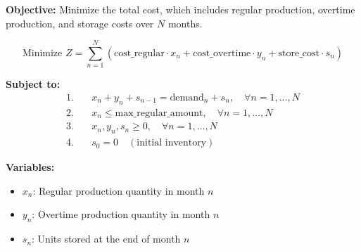 \documentclass{article}
\begin{document}
\textbf{Objective:}
Minimize the total cost, which includes regular production, overtime production, and storage costs over \( N \) months.

\[
\text{Minimize } Z = \sum_{n=1}^{N} ( \text{cost\_regular} \cdot x_n + \text{cost\_overtime} \cdot y_n + \text{store\_cost} \cdot s_n)
\]

\textbf{Subject to:}
\begin{align*}
1. & \quad x_n + y_n + s_{n-1} = \text{demand}_n + s_n, \quad \forall n = 1, \ldots, N \\
2. & \quad x_n \leq \text{max\_regular\_amount}, \quad \forall n = 1, \ldots, N \\
3. & \quad x_n, y_n, s_n \geq 0, \quad \forall n = 1, \ldots, N \\
4. & \quad s_0 = 0 \quad (\text{initial inventory})
\end{align*}

\textbf{Variables:}
\begin{itemize}
    \item \( x_n \): Regular production quantity in month \( n \)
    \item \( y_n \): Overtime production quantity in month \( n \)
    \item \( s_n \): Units stored at the end of month \( n \)
\end{itemize}
\end{document}
